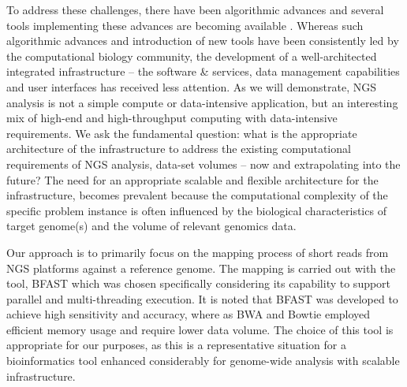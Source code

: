 \documentclass{cpeauth}
\begin{document}
To address these challenges, there have been algorithmic advances and
several tools implementing these advances are becoming available
\cite{trapnell2009,bfast2009,scheibye-alsing2009,pepke2009,samtools}.
Whereas such algorithmic advances and introduction of new tools have
been consistently led by the computational biology community, the
development of a well-architected integrated infrastructure -- the
software \& services, data management capabilities and user interfaces
has received less attention.  As we will demonstrate, NGS analysis is
not a simple compute or data-intensive application, but an interesting
mix of high-end and high-throughput computing with data-intensive
requirements.  We ask the fundamental question: what is the
appropriate architecture of the infrastructure to address the existing
computational requirements of NGS analysis, data-set volumes -- now
and extrapolating into the future?  The need for an appropriate
scalable and flexible architecture for the infrastructure, becomes
prevalent because the computational complexity of the specific problem
instance is often influenced by the biological characteristics of 
target genome(s) and the volume of relevant genomics data.


Our approach is to primarily focus on the mapping process of short
reads from NGS platforms against a reference genome.  The mapping is
carried out with the tool, BFAST\cite{bfast2009, bfast2009b} which was
chosen specifically considering its capability to support parallel and
multi-threading execution.
It is noted that BFAST was developed to achieve high sensitivity and accuracy, where as BWA and Bowtie employed efficient memory usage and require lower data volume\cite{bfast2009}.
 The choice of this tool is appropriate for our purposes, as this %
is a representative situation for a bioinformatics tool enhanced
considerably for genome-wide analysis with scalable infrastructure.

\end{document}

